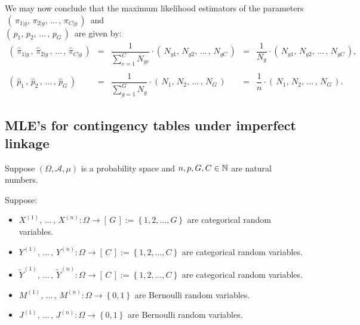 We may now conclude that the maximum likelihood estimators of the parameters
\,$\left(\,\pi_{1\vert g},\,\pi_{2\vert g}, \,\ldots\,, \,\pi_{C\vert g}\,\right)$\,
and\\
$\left(\,p_{1},\,p_{2}, \,\ldots\,, \,p_{G}\,\right)$\,
are given by:
\begin{equation*}
	\begin{array}{ccccc}
	\left(\,\widehat{\pi}_{1\vert g}\,,\,\widehat{\pi}_{2\vert g}\,, \,\ldots\,, \,\widehat{\pi}_{C\vert g}\,\right)
	& = & \dfrac{1}{\sum^{C}_{c=1}N_{gc}} \cdot \left(\,N_{g1},\,N_{g2}, \,\ldots\,,\, N_{gC}\,\right)
	& = & \dfrac{1}{N_{g}} \cdot \left(\,N_{g1},\,N_{g2}, \,\ldots\,,\, N_{gC}\,\right),
	\\ \\
	\left(\,\widehat{p}_{1}\,,\,\widehat{p}_{2}\,, \,\ldots\,, \,\widehat{p}_{G}\,\right)
	& = & \dfrac{1}{\sum^{G}_{g=1}N_{g}} \cdot \left(\,N_{1},\,N_{2}, \,\ldots\,,\, N_{G}\,\right)
	& = & \dfrac{1}{n} \cdot \left(\,N_{1},\,N_{2}, \,\ldots\,,\, N_{G}\,\right).
	\end{array}
\end{equation*}


\subsection{MLE's for contingency tables under imperfect linkage}

Suppose
$\left(\Omega,\mathcal{A},\mu\right)$ is a probability space and
$n, p, G, C \in \mathbb{N}$ are natural numbers.

\vskip 0.3cm
\noindent
Suppose:
\begin{itemize}
\item
	$X^{(1)}, \,\ldots\,,\, X^{(n)} : \Omega \longrightarrow \left[\,G\,\right] := \left\{1,2,\ldots,G\right\}$
	are categorical random variables.
\item
	$Y^{(1)}, \,\ldots\,,\, Y^{(n)} : \Omega \longrightarrow \left[\,C\,\right] := \left\{1,2,\ldots,C\right\}$
	are categorical random variables.
\item
	$\widetilde{Y}^{(1)}, \,\ldots\,,\, \widetilde{Y}^{(n)} : \Omega \longrightarrow \left[\,C\,\right] := \left\{1,2,\ldots,C\right\}$
	are categorical random variables.
\item
	$M^{(1)}, \,\ldots\,,\, M^{(n)} : \Omega \longrightarrow \left\{0,1\right\}$
	are Bernoulli random variables.
\item
	$J^{(1)}, \,\ldots\,,\, J^{(n)} : \Omega \longrightarrow \left\{0,1\right\}$
	are Bernoulli random variables.
\end{itemize}

